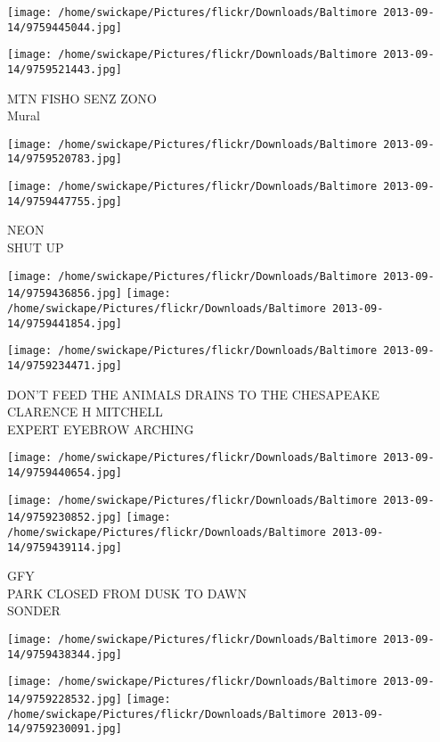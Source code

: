 \documentclass[10pt,letterpaper]{article}
\begin{document}
\texttt{[image: /home/swickape/Pictures/flickr/Downloads/Baltimore 2013-09-14/9759445044.jpg]}

\vspace{0.25in}
\texttt{[image: /home/swickape/Pictures/flickr/Downloads/Baltimore 2013-09-14/9759521443.jpg]}

MTN FISHO SENZ ZONO\\
Mural
\pagebreak

\texttt{[image: /home/swickape/Pictures/flickr/Downloads/Baltimore 2013-09-14/9759520783.jpg]}

\vspace{0.25in}
\texttt{[image: /home/swickape/Pictures/flickr/Downloads/Baltimore 2013-09-14/9759447755.jpg]}

NEON\\
SHUT UP
\pagebreak

\texttt{[image: /home/swickape/Pictures/flickr/Downloads/Baltimore 2013-09-14/9759436856.jpg]}
\texttt{[image: /home/swickape/Pictures/flickr/Downloads/Baltimore 2013-09-14/9759441854.jpg]}

\vspace{0.25in}
\texttt{[image: /home/swickape/Pictures/flickr/Downloads/Baltimore 2013-09-14/9759234471.jpg]}

DON'T FEED THE ANIMALS DRAINS TO THE CHESAPEAKE\\
CLARENCE H MITCHELL\\
EXPERT EYEBROW ARCHING
\pagebreak

\texttt{[image: /home/swickape/Pictures/flickr/Downloads/Baltimore 2013-09-14/9759440654.jpg]}

\vspace{0.25in}
\texttt{[image: /home/swickape/Pictures/flickr/Downloads/Baltimore 2013-09-14/9759230852.jpg]}
\texttt{[image: /home/swickape/Pictures/flickr/Downloads/Baltimore 2013-09-14/9759439114.jpg]}

GFY\\
PARK CLOSED FROM DUSK TO DAWN\\
SONDER
\pagebreak

\texttt{[image: /home/swickape/Pictures/flickr/Downloads/Baltimore 2013-09-14/9759438344.jpg]}

\vspace{0.25in}
\texttt{[image: /home/swickape/Pictures/flickr/Downloads/Baltimore 2013-09-14/9759228532.jpg]}
\texttt{[image: /home/swickape/Pictures/flickr/Downloads/Baltimore 2013-09-14/9759230091.jpg]}
\end{document}
